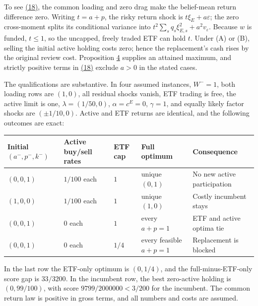 \documentclass[11pt]{article}
\begin{document}
To see \hyperref[eq:18]{(18)}, the common loading and zero drag make the belief-mean
return difference zero. Writing \(t=a+p\), the risky return shock is
\(t\xi_E+a\varepsilon\); the zero cross-moment splits its conditional
variance into \(t^2\sum_s q_s\xi_{E,s}^2+a^2v_\varepsilon\).
Because \(w\) is funded, \(t\leq1\), so the uncapped, freely traded
ETF can hold \(t\). Under (A) or (B), selling the initial active
holding costs zero; hence the replacement's cash rises by the
original review cost. Proposition \hyperref[res:Proposition-4]{4} supplies an attained maximum,
and strictly positive terms in \hyperref[eq:18]{(18)} exclude \(a>0\) in the stated
cases.

The qualifications are substantive. In four assumed instances,
\(W^-=1\), both loading rows are \((1,0)\), all residual shocks
vanish, ETF trading is free, the active limit is one,
\(\lambda=(1/50,0)\), \(\alpha=c^E=0\), \(\gamma=1\), and equally likely
factor shocks are \((\pm1/10,0)\). Active and ETF returns are
identical, and the following outcomes are exact:

{\scriptsize\setlength{\tabcolsep}{4pt}
\begin{longtable}{lllll}
\toprule
\textbf{Initial \((a^-,p^-,k^-)\)} & \textbf{Active buy/sell rates} & \textbf{ETF cap} & \textbf{Full optimum} & \textbf{Consequence} \\
\midrule
\endhead
\bottomrule
\endlastfoot
\((0,0,1)\) & \(1/100\) each & \(1\) & unique \((0,1)\) & No new active participation \\
\((1,0,0)\) & \(1/100\) each & \(1\) & unique \((1,0)\) & Costly incumbent stays \\
\((0,0,1)\) & \(0\) each & \(1\) & every \(a+p=1\) & ETF and active optima tie \\
\((0,0,1)\) & \(0\) each & \(1/4\) & every feasible \(a+p=1\) & Replacement is blocked \\
\end{longtable}}

In the last row the ETF-only optimum is \((0,1/4)\), and the
full-minus-ETF-only score gap is \(33/3200\). In the incumbent row,
the best zero-active holding is \((0,99/100)\), with score
\(9799/2000000<3/200\) for the incumbent. The common return law is
positive in gross terms, and all numbers and costs are assumed.
\end{document}
